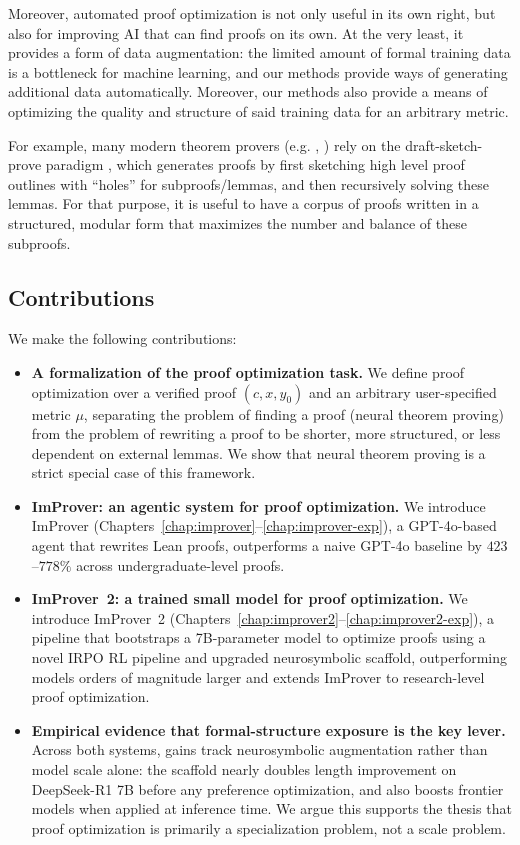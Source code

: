 Moreover, automated proof optimization is not only useful in its own right, but also for improving AI that can find proofs on its own. At the very least, it provides a form of data augmentation: the limited amount of formal training data is a bottleneck for machine learning, and our methods provide ways of generating additional data automatically. Moreover, our methods also provide a means of optimizing the quality and structure of said training data for an arbitrary metric. 

For example, many modern theorem provers (e.g. \cite{alphaproof}, \cite{GodelProver}) rely on the draft-sketch-prove paradigm \cite{jiang2023draft}, which generates proofs by first sketching high level proof outlines with ``holes'' for subproofs/lemmas, and then recursively solving these lemmas. For that purpose, it is useful to have a corpus of proofs written in a structured, modular form that maximizes the number and balance of these subproofs. 

\subsection{Contributions}

We make the following contributions:
\begin{itemize}
    \item \textbf{A formalization of the proof optimization task.} We define proof optimization over a verified proof $(c,x,y_0)$ and an arbitrary user-specified metric $\mu$, separating the problem of finding a proof (neural theorem proving) from the problem of rewriting a proof to be shorter, more structured, or less dependent on external lemmas. We show that neural theorem proving is a strict special case of this framework.
    \item \textbf{ImProver: an agentic system for proof optimization.} We introduce ImProver (Chapters~\ref{chap:improver}--\ref{chap:improver-exp}), a GPT-4o-based agent that rewrites Lean proofs, outperforms a naive GPT-4o baseline by $423$--$778\%$ across undergraduate-level proofs.
    \item \textbf{ImProver~2: a trained small model for proof optimization.} We introduce ImProver~2 (Chapters~\ref{chap:improver2}--\ref{chap:improver2-exp}), a pipeline that bootstraps a 7B-parameter model to optimize proofs using a novel IRPO RL pipeline and upgraded neurosymbolic scaffold, outperforming models orders of magnitude larger and extends ImProver to research-level proof optimization.
    \item \textbf{Empirical evidence that formal-structure exposure is the key lever.} Across both systems, gains track neurosymbolic augmentation rather than model scale alone: the scaffold nearly doubles length improvement on DeepSeek-R1 7B before any preference optimization, and also boosts frontier models when applied at inference time. We argue this supports the thesis that proof optimization is primarily a specialization problem, not a scale problem.
\end{itemize}

